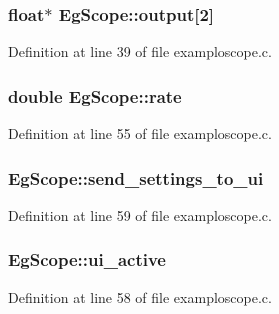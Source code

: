\subsubsection[{\texorpdfstring{output}{output}}]{\setlength{\rightskip}{0pt plus 5cm}float$\ast$ Eg\+Scope\+::output\mbox{[}2\mbox{]}}\hypertarget{struct_eg_scope_a436eaf57cf483d9510bbeea14229bf97}{}\label{struct_eg_scope_a436eaf57cf483d9510bbeea14229bf97}


Definition at line 39 of file examploscope.\+c.

\subsubsection[{\texorpdfstring{rate}{rate}}]{\setlength{\rightskip}{0pt plus 5cm}double Eg\+Scope\+::rate}\hypertarget{struct_eg_scope_af2dae6142593e344dbc655acb1e48211}{}\label{struct_eg_scope_af2dae6142593e344dbc655acb1e48211}


Definition at line 55 of file examploscope.\+c.

\subsubsection[{\texorpdfstring{send\+\_\+settings\+\_\+to\+\_\+ui}{send_settings_to_ui}}]{ Eg\+Scope\+::send\+\_\+settings\+\_\+to\+\_\+ui}\hypertarget{struct_eg_scope_a3fd4064d2f0f08a756857ce489b5f569}{}\label{struct_eg_scope_a3fd4064d2f0f08a756857ce489b5f569}


Definition at line 59 of file examploscope.\+c.

\subsubsection[{\texorpdfstring{ui\+\_\+active}{ui_active}}]{ Eg\+Scope\+::ui\+\_\+active}\hypertarget{struct_eg_scope_ae94d417ae78e4820338f02b6e52afaaa}{}\label{struct_eg_scope_ae94d417ae78e4820338f02b6e52afaaa}


Definition at line 58 of file examploscope.\+c.

